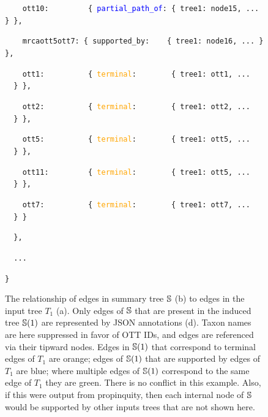 \documentclass[fleqn,12pt,lineno,english]{wlpeerj}
\begin{document}
\begin{figure}
{{\begin{minipage}[t]{1.0\columnwidth}
\texttt{~~~~\textquotedbl{}ott10\textquotedbl{}:~~~~~~~~~\{
\textquotedbl{}}\texttt{\textcolor{blue}{partial\_path\_of}}\texttt{\textquotedbl{}: \{
\textquotedbl{}tree1\textquotedbl{}: \textquotedbl{}node15\textquotedbl{},
... \} \},}

\texttt{~~~~\textquotedbl{}mrcaott5ott7\textquotedbl{}: \{ \textquotedbl{}\textcolor{mylime}{supported\_by}\textquotedbl{}:~~~
\{ \textquotedbl{}tree1\textquotedbl{}: \textquotedbl{}node16\textquotedbl{},
... \} \},}

\texttt{~~~~\textquotedbl{}ott1\textquotedbl{}:~~~~~~~~~~\{
\textquotedbl{}}\texttt{\textcolor{orange}{terminal}}\texttt{\textquotedbl{}: ~~~~~~~\{
\textquotedbl{}tree1\textquotedbl{}: \textquotedbl{}ott1\textquotedbl{},
... ~~\} \},}

\texttt{~~~~\textquotedbl{}ott2\textquotedbl{}:~~~~~~~~~~\{
\textquotedbl{}}\texttt{\textcolor{orange}{terminal}}\texttt{\textquotedbl{}: ~~~~~~~\{
\textquotedbl{}tree1\textquotedbl{}: \textquotedbl{}ott2\textquotedbl{},
... ~~\} \},}

\texttt{~~~~\textquotedbl{}ott5\textquotedbl{}:~~~~~~~~~~\{
\textquotedbl{}}\texttt{\textcolor{orange}{terminal}}\texttt{\textquotedbl{}: ~~~~~~~\{
\textquotedbl{}tree1\textquotedbl{}: \textquotedbl{}ott5\textquotedbl{},
... ~~\} \},}

\texttt{~~~~\textquotedbl{}ott11\textquotedbl{}:~~~~~~~~~\{
\textquotedbl{}}\texttt{\textcolor{orange}{terminal}}\texttt{\textquotedbl{}: ~~~~~~~\{
\textquotedbl{}tree1\textquotedbl{}: \textquotedbl{}ott5\textquotedbl{},
... ~~\} \},}

\texttt{~~~~\textquotedbl{}ott7\textquotedbl{}:~~~~~~~~~~\{
\textquotedbl{}}\texttt{\textcolor{orange}{terminal}}\texttt{\textquotedbl{}: ~~~~~~~\{
\textquotedbl{}tree1\textquotedbl{}: \textquotedbl{}ott7\textquotedbl{},
... ~~\} \}}

\texttt{~~\},}

\texttt{~~...}

\texttt{\} }%
\end{minipage}}

}\hfill{}

\caption{\label{fig:displayed-annotations}The relationship of edges in summary
tree $\protect\mathbb{S}$ (b) to edges in the input tree $T_{1}$
(a). Only edges of $\protect\mathbb{S}$ that are present in the
induced tree $\protect\mathbb{S}(1)$ are represented by JSON annotations
(d). Taxon names are here suppressed in favor of OTT IDs, and edges
are referenced via their tipward nodes. Edges in $\protect\mathbb{S}(1)$
that correspond to terminal edges of $T_{1}$ are orange; edges of
$\protect\mathbb{S}(1)$ that are supported by edges of $T_{1}$
are blue; where multiple edges of $\protect\mathbb{S}(1)$ correspond
to the same edge of $T_{1}$ they are green. There is no conflict
in this example. Also, if this were output from propinquity, then
each internal node of $\protect\mathbb{S}$ would be supported by
other inputs trees that are not shown here. }
\end{figure}
\end{document}

